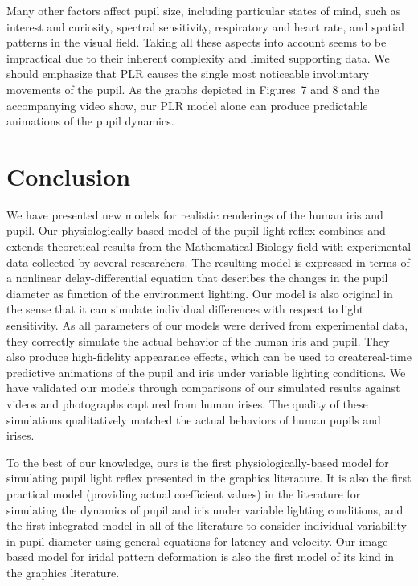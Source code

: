 \documentclass{acmtog}
\begin{document}
Many other factors affect pupil size, including particular states of mind, such as interest and curiosity, spectral sensitivity, respiratory and heart rate, and spatial patterns in the visual field. Taking all these aspects into account seems to be impractical due to their inherent complexity and limited supporting data. We should emphasize that PLR causes the single most noticeable involuntary movements of the pupil. As the graphs depicted in
Figures~7 and 8 and the accompanying video
show, our PLR model alone can produce predictable animations of the pupil dynamics. 

\section{Conclusion}
\label{sec:conclusion}
%
We have presented new models for realistic renderings of the human iris and pupil. 
Our physiologically-based model of the pupil light reflex combines and extends theoretical results from the Mathematical Biology field with experimental data collected by several researchers. The resulting model is expressed in terms of a nonlinear delay-differential equation that describes the changes in the pupil diameter as function of the environment lighting. Our model is also original in the sense that it can simulate individual differences with respect to light sensitivity. As all parameters of our models were derived from experimental data, they correctly simulate the actual behavior of the human iris and pupil. They also produce high-fidelity appearance effects, which can be used to create\break real-time predictive animations of the pupil and iris under variable lighting conditions.
We have validated our models through comparisons of our simulated results against videos and photographs captured from human irises. The quality of these simulations qualitatively matched the actual behaviors of human pupils and irises.

  
To the best of our knowledge, ours is the first  physiologically-based model for simulating pupil light reflex presented
in the graphics literature. It is also the first practical model (providing actual coefficient values) in the literature
for simulating the dynamics of pupil and iris under variable lighting conditions, and the first integrated model in all of
the  literature to consider individual variability in pupil diameter using general equations for latency and velocity. Our
image-based model for iridal pattern deformation is also the first model of its kind in the graphics literature.\vskip21pt
\end{document}

